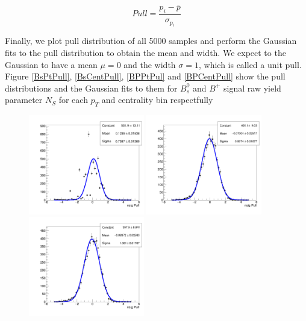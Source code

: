 \begin{equation}
Pull = \frac{p_i - \bar p}{\sigma_{p_i}}
\end{equation}

Finally, we plot pull distribution of all 5000 samples and perform the Gaussian fits to the pull distribution to obtain the mean and width. We expect to the Gaussian to have a mean $\mu = 0$ and the width $\sigma = 1$, which is called a unit pull. Figure \ref{BsPtPull}, \ref{BsCentPull}, \ref{BPPtPul} and \ref{BPCentPull} show the pull distributions and the Gaussian fits to them for $B^0_s$ and $B^+$ signal raw yield parameter $N_S$ for each $p_T$ and centrality bin respectfully 



\begin{figure}[h]
\begin{center}
\includegraphics[width= 0.45\textwidth]{Figures/Chapter5/pull_signal_BptNew_0_90_7_10_0_Bs.png}
\includegraphics[width= 0.45\textwidth]{Figures/Chapter5/pull_signal_BptNew_0_90_10_15_0_Bs.png}
\includegraphics[width= 0.45\textwidth]{Figures/Chapter5/pull_signal_BptNew_0_90_15_20_0_Bs.png}

\end{center}
\end{figure}
